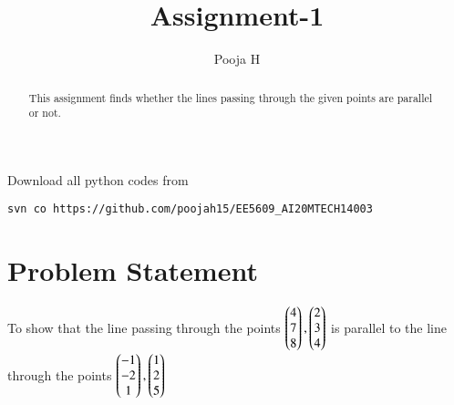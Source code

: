 \documentclass[journal,12pt,twocolumn]{IEEEtran}
\begin{document}
\let\vec\mathbf
\renewcommand{\thefigure}{\theproblem}
\def\putbox#1#2#3{\makebox[0in][l]{\makebox[#1][l]{}\raisebox{\baselineskip}[0in][0in]{\raisebox{#2}[0in][0in]{#3}}}}
     \def\rightbox#1{\makebox[0in][r]{#1}}
     \def\centbox#1{\makebox[0in]{#1}}
     \def\topbox#1{\raisebox{-\baselineskip}[0in][0in]{#1}}
     \def\midbox#1{\raisebox{-0.5\baselineskip}[0in][0in]{#1}}
\vspace{3cm}
\title{Assignment-1}
\author{Pooja H}
\maketitle
\newpage
\bigskip
\renewcommand{\thefigure}{\theenumi}
\renewcommand{\thetable}{\theenumi}
\begin{abstract}
This assignment finds whether the lines passing through the given points are parallel or not.
\end{abstract}
Download all python codes from 

\begin{lstlisting}
svn co https://github.com/poojah15/EE5609_AI20MTECH14003
\end{lstlisting}


\section{Problem Statement}
To show that the line passing through the points $\begin{pmatrix}4\\7\\8\end{pmatrix}, \begin{pmatrix}2\\3\\4\end{pmatrix}$ is parallel to the line through the points $\begin{pmatrix}-1\\-2\\1\end{pmatrix}, \begin{pmatrix}1\\2\\5\end{pmatrix}$
\end{document}
